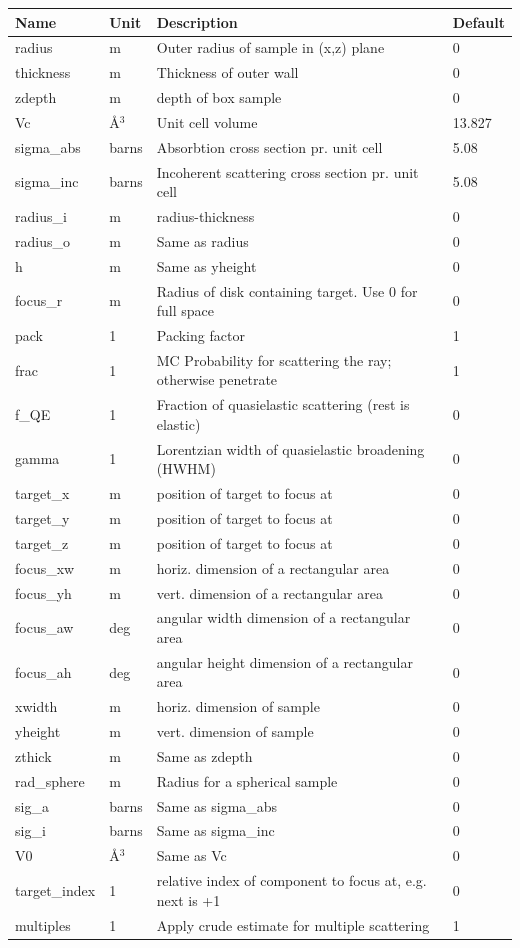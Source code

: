 \begin{longtable}{p{}p{}p{}p{}}
\toprule
\textbf{Name} & \textbf{Unit} & \textbf{Description} & \textbf{Default} \\
\midrule
\endhead
radius & m & Outer radius of sample in (x,z) plane & 0 \\
thickness & m & Thickness of outer wall & 0 \\
zdepth & m & depth of box sample & 0 \\
Vc & \AA{}$^{3}$ & Unit cell volume & 13.827 \\
sigma\_abs & barns & Absorbtion cross section pr. unit cell & 5.08 \\
sigma\_inc & barns & Incoherent scattering cross section pr. unit cell & 5.08 \\
radius\_i & m & radius-thickness & 0 \\
radius\_o & m & Same as radius & 0 \\
h & m & Same as yheight & 0 \\
focus\_r & m & Radius of disk containing target. Use 0 for full space & 0 \\
pack & 1 & Packing factor & 1 \\
frac & 1 & MC Probability for scattering the ray; otherwise penetrate & 1 \\
f\_QE & 1 & Fraction of quasielastic scattering (rest is elastic) & 0 \\
gamma & 1 & Lorentzian width of quasielastic broadening (HWHM) & 0 \\
target\_x & m & position of target to focus at & 0 \\
target\_y & m & position of target to focus at & 0 \\
target\_z & m & position of target to focus at & 0 \\
focus\_xw & m & horiz. dimension of a rectangular area & 0 \\
focus\_yh & m & vert.  dimension of a rectangular area & 0 \\
focus\_aw & deg & angular width dimension of a rectangular area & 0 \\
focus\_ah & deg & angular height dimension of a rectangular area & 0 \\
xwidth & m & horiz. dimension of sample & 0 \\
yheight & m & vert.  dimension of sample & 0 \\
zthick & m & Same as zdepth & 0 \\
rad\_sphere & m & Radius for a spherical sample & 0 \\
sig\_a & barns & Same as sigma\_abs & 0 \\
sig\_i & barns & Same as sigma\_inc & 0 \\
V0 & \AA{}$^{3}$ & Same as Vc & 0 \\
target\_index & 1 & relative index of component to focus at, e.g. next is +1 & 0 \\
multiples & 1 & Apply crude estimate for multiple scattering & 1 \\
\bottomrule
\end{longtable}

